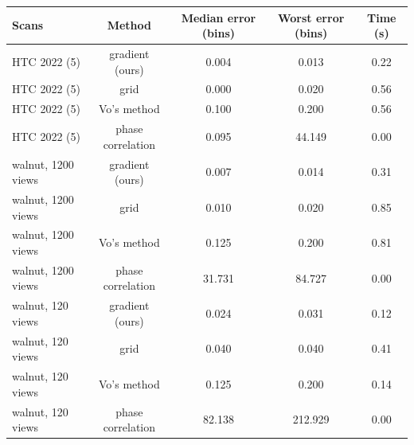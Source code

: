 \begin{tabular}{lcccc}
\toprule
Scans & Method & Median error (bins) & Worst error (bins) & Time (s) \\
\midrule
HTC 2022 (5) & gradient (ours) & 0.004 & 0.013 & 0.22 \\
HTC 2022 (5) & grid & 0.000 & 0.020 & 0.56 \\
HTC 2022 (5) & Vo's method & 0.100 & 0.200 & 0.56 \\
HTC 2022 (5) & phase correlation & 0.095 & 44.149 & 0.00 \\
walnut, 1200 views & gradient (ours) & 0.007 & 0.014 & 0.31 \\
walnut, 1200 views & grid & 0.010 & 0.020 & 0.85 \\
walnut, 1200 views & Vo's method & 0.125 & 0.200 & 0.81 \\
walnut, 1200 views & phase correlation & 31.731 & 84.727 & 0.00 \\
walnut, 120 views & gradient (ours) & 0.024 & 0.031 & 0.12 \\
walnut, 120 views & grid & 0.040 & 0.040 & 0.41 \\
walnut, 120 views & Vo's method & 0.125 & 0.200 & 0.14 \\
walnut, 120 views & phase correlation & 82.138 & 212.929 & 0.00 \\
\bottomrule
\end{tabular}
